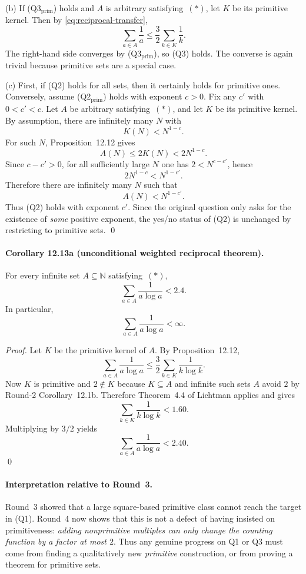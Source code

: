 (b) If \textnormal{(Q3$_{\mathrm{prim}}$)} holds and $A$ is arbitrary satisfying~$(*)$, let $K$ be its primitive kernel.
Then by \eqref{eq:reciprocal-transfer},
\[
\sum_{a\in A}\frac1a\le \frac32\sum_{k\in K}\frac1k.
\]
The right-hand side converges by \textnormal{(Q3$_{\mathrm{prim}}$)}, so \textnormal{(Q3)} holds.
The converse is again trivial because primitive sets are a special case.

(c) First, if \textnormal{(Q2)} holds for all sets, then it certainly holds for primitive ones.
Conversely, assume \textnormal{(Q2$_{\mathrm{prim}}$)} holds with exponent $c>0$.
Fix any $c'$ with $0<c'<c$.
Let $A$ be arbitrary satisfying~$(*)$, and let $K$ be its primitive kernel.
By assumption, there are infinitely many $N$ with
\[
K(N)<N^{1-c}.
\]
For such $N$, Proposition~12.12 gives
\[
A(N)\le 2K(N)<2N^{1-c}.
\]
Since $c-c'>0$, for all sufficiently large $N$ one has $2<N^{c-c'}$, hence
\[
2N^{1-c}<N^{1-c'}.
\]
Therefore there are infinitely many $N$ such that
\[
A(N)<N^{1-c'}.
\]
Thus \textnormal{(Q2)} holds with exponent $c'$.
Since the original question only asks for the existence of \emph{some} positive exponent, the yes/no status of \textnormal{(Q2)} is unchanged by restricting to primitive sets.
\qed

\bigskip

\paragraph{\textbf{Corollary 12.13a (unconditional weighted reciprocal theorem).}}
For every infinite set $A\subseteq\mathbb N$ satisfying~$(*)$,
\[
\sum_{a\in A}\frac1{a\log a}<2.4.
\]
In particular,
\[
\sum_{a\in A}\frac1{a\log a}<\infty.
\]

\emph{Proof.}
Let $K$ be the primitive kernel of $A$.
By Proposition~12.12,
\[
\sum_{a\in A}\frac1{a\log a}
\le \frac32\sum_{k\in K}\frac1{k\log k}.
\]
Now $K$ is primitive and $2\notin K$ because $K\subseteq A$ and infinite such sets $A$ avoid $2$ by Round-2 Corollary~12.1b.
Therefore Theorem~4.4 of Lichtman applies and gives
\[
\sum_{k\in K}\frac1{k\log k}<1.60.
\]
Multiplying by $3/2$ yields
\[
\sum_{a\in A}\frac1{a\log a}<2.40.
\]
\qed

\bigskip

\paragraph{\textbf{Interpretation relative to Round~3.}}
Round~3 showed that a large square-based primitive class cannot reach the target in \textnormal{(Q1)}.
Round~4 now shows that this is not a defect of having insisted on primitiveness: \emph{adding nonprimitive multiples can only change the counting function by a factor at most $2$}. Thus any genuine progress on Q1 or Q3 must come from finding a qualitatively new \emph{primitive} construction, or from proving a theorem for primitive sets.

